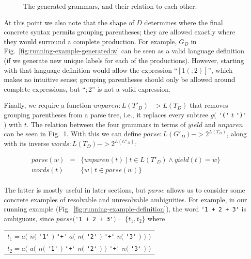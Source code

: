 \documentclass[runningheads]{llncs}
\newcommand{\yield}{\mathit{yield}} %
\newcommand{\semantic}{\mathit{unparen}} %
\newcommand{\parse}{\mathit{parse}} %
\newcommand{\words}{\mathit{words}} %
\begin{document}
\begin{figure}
  \caption{The generated grammars, and their relation to each other.}
  \label{fig:grammar-square}
\end{figure}

At this point we also note that the shape of $D$ determines where the final concrete syntax permits grouping parentheses; they are allowed exactly where they would surround a complete production. For example, $G_D$ in Fig.~\ref{fig:running-example-generated:w} can be seen as a valid language definition (if we generate new unique labels for each of the productions). However, starting with that language definition would allow the expression ``$[1(;2)]$'', which makes no intuitive sense; grouping parentheses should only be allowed around complete expressions, but ``$;2$'' is not a valid expression.

Finally, we require a function $\semantic : L(T'_D) -> L(T_D)$ that removes grouping parentheses from a parse tree, i.e., it replaces every subtree $g($ \verb|'('| $t$ \verb|')'| $)$ with $t$. The relation between the four grammars in terms of $\yield$ and $\semantic$ can be seen in Fig.~\ref{fig:grammar-square}. With this we can define $\parse : L(G'_D) -> 2^{L(T_D)}$, along with its inverse $\words : L(T_D) -> 2^{L(G'_D)}$:

$$
\begin{array}{rcl}
\parse(w) & = & \{ \semantic(t) \mid t \in L(T'_D) \land \yield(t) = w \} \\
\words(t) & = & \{ w \mid t \in \parse(w) \} \\
\end{array}
$$

\noindent The latter is mostly useful in later sections, but $\parse$ allows us to consider some concrete examples of resolvable and unresolvable ambiguities. For example, in our running example (Fig.~\ref{fig:running-example-definition}), the word \verb|'1 + 2 + 3'| is ambiguous, since $\parse($\verb|'1 + 2 + 3'|$) = \{t_1, t_2\}$ where

\begin{center}
  \begin{tabular}{l}
    $t_1 = a($ \hphantom{$a($} $n($ \verb|'1'| $)$ \verb|'+'| $a($ $n($ \verb|'2'| $)$ \hphantom{$)$} \verb|'+'| $n($ \verb|'3'| $)$ $)$ $)$ \\
    $t_2 = a($ $a($ $n($ \verb|'1'| $)$ \verb|'+'| \hphantom{$a($} $n($ \verb|'2'| $)$ $)$ \verb|'+'| $n($ \verb|'3'| $)$ \hphantom{$)$} $)$ \\
  \end{tabular}
\end{center}
\end{document}
